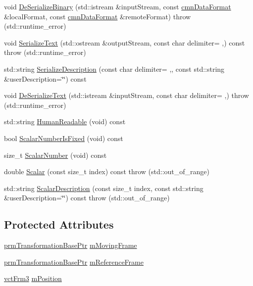 \begin{DoxyCompactItemize}
void \hyperlink{classprm_position_cartesian_get_a3141c14f47e841dd509a481bbf259fea}{De\+Serialize\+Binary} (std\+::istream \&input\+Stream, const \hyperlink{classcmn_data_format}{cmn\+Data\+Format} \&local\+Format, const \hyperlink{classcmn_data_format}{cmn\+Data\+Format} \&remote\+Format)  throw (std\+::runtime\+\_\+error)
\item 
void \hyperlink{classprm_position_cartesian_get_aa2b500c82ad5a3a65a095763b211a490}{Serialize\+Text} (std\+::ostream \&output\+Stream, const char delimiter= \textquotesingle{},\textquotesingle{}) const   throw (std\+::runtime\+\_\+error)
\item 
std\+::string \hyperlink{classprm_position_cartesian_get_a49d143acebdb99bdee40533a921a3de6}{Serialize\+Description} (const char delimiter= \textquotesingle{},\textquotesingle{}, const std\+::string \&user\+Description=\char`\"{}\char`\"{}) const 
\item 
void \hyperlink{classprm_position_cartesian_get_ab707eeb5d7002b67ca6601fbcae98174}{De\+Serialize\+Text} (std\+::istream \&input\+Stream, const char delimiter= \textquotesingle{},\textquotesingle{})  throw (std\+::runtime\+\_\+error)
\item 
std\+::string \hyperlink{classprm_position_cartesian_get_a1a4ca372a09cd8220207215a33122c0f}{Human\+Readable} (void) const 
\item 
bool \hyperlink{classprm_position_cartesian_get_aec2aa7c72969c0afb623e6857d8de58a}{Scalar\+Number\+Is\+Fixed} (void) const 
\item 
size\+\_\+t \hyperlink{classprm_position_cartesian_get_a29846aae8d98171d25618628192aceda}{Scalar\+Number} (void) const 
\item 
double \hyperlink{classprm_position_cartesian_get_a0efd97a9d97682f5dd6ca9319608be88}{Scalar} (const size\+\_\+t index) const   throw (std\+::out\+\_\+of\+\_\+range)
\item 
std\+::string \hyperlink{classprm_position_cartesian_get_ac0c28dc368255ab642480434d2b28483}{Scalar\+Description} (const size\+\_\+t index, const std\+::string \&user\+Description=\char`\"{}\char`\"{}) const   throw (std\+::out\+\_\+of\+\_\+range)
\end{DoxyCompactItemize}
\subsection*{Protected Attributes}
\begin{DoxyCompactItemize}
\item 
\hyperlink{prm_transformation_base_8h_a881a6a7d2191474974cdf36d79e1df08}{prm\+Transformation\+Base\+Ptr} \hyperlink{classprm_position_cartesian_get_a01778edc80fb05f525a61afd47753631}{m\+Moving\+Frame}
\item 
\hyperlink{prm_transformation_base_8h_a881a6a7d2191474974cdf36d79e1df08}{prm\+Transformation\+Base\+Ptr} \hyperlink{classprm_position_cartesian_get_a64e672cde3d04a727f394fc97dc455ed}{m\+Reference\+Frame}
\item 
\hyperlink{vct_transformation_types_8h_a81feda0a02c2d1bc26e5553f409fed20}{vct\+Frm3} \hyperlink{classprm_position_cartesian_get_ac1033fd1dd058ef3976c5161a483fa92}{m\+Position}
\end{DoxyCompactItemize}


